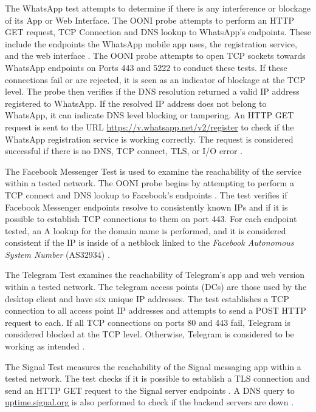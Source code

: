 The WhatsApp test attempts to determine if there is any interference or blockage of its App or Web Interface. The OONI probe attempts to perform an HTTP GET request, TCP Connection and DNS lookup to WhatsApp's endpoints. These include the endpoints the WhatsApp mobile app uses, the registration service, and the web interface \cite{ooniWhatsAppTest}. The OONI probe attempts to open TCP sockets towards WhatsApp endpoints on Ports 443 and 5222 to conduct these tests. If these connections fail or are rejected, it is seen as an indicator of blockage at the TCP level. The probe then verifies if the DNS resolution returned a valid IP address registered to WhatsApp. If the resolved IP address does not belong to WhatsApp, it can indicate DNS level blocking or tampering. An HTTP GET request is sent to the URL \url{https://v.whatsapp.net/v2/register} to check if the WhatsApp registration service is working correctly. The request is considered successful if there is no DNS, TCP connect, TLS, or I/O error \cite{WhatsAppTestGitHub}. 

The Facebook Messenger Test is used to examine the reachability of the service within a tested network. The OONI probe begins by attempting to perform a TCP connect and DNS lookup to Facebook's endpoints \cite{ooniFacebookMessenger}. The test verifies if Facebook Messenger endpoints resolve to consistently known IPs and if it is possible to establish TCP connections to them on port 443. For each endpoint tested, an A lookup for the domain name is performed, and it is considered consistent if the IP is inside of a netblock linked to the \textit{Facebook Autonomous System Number} (AS32934) \cite{FacebookTestGitHub}.

The Telegram Test examines the reachability of Telegram's app and web version within a tested network. The telegram access points (DCs) are those used by the desktop client and have six unique IP addresses. The test establishes a TCP connection to all access point IP addresses and attempts to send a POST HTTP request to each. If all TCP connections on ports 80 and 443 fail, Telegram is considered blocked at the TCP level. Otherwise, Telegram is considered to be working as intended \cite{TelegramTestGitHub}. 

The Signal Test measures the reachability of the Signal messaging app within a tested network. The test checks if it is possible to establish a TLS connection and send an HTTP GET request to the Signal server endpoints \cite{ooniSignalTest}. A DNS query to \url{uptime.signal.org} is also performed to check if the backend servers are down \cite{SignalTestGitHub}. 

